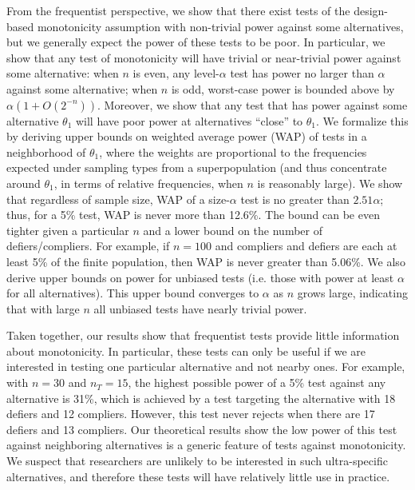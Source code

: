 \documentclass[12pt,reqno]{amsart}
\begin{document}
From the frequentist perspective, we show that there exist tests of the design-based
monotonicity assumption with non-trivial power against some alternatives, but we
generally expect the power of these tests to be poor. In particular, we show that any test of monotonicity will have trivial or near-trivial power against some alternative: when $n$ is even, any level-$\alpha$ test has power no larger than $\alpha$ against some alternative; when $n$ is odd, worst-case power is bounded above by $\alpha (1 + O(2^{-n}))$. Moreover, we show
that any test that has power against some alternative $\theta_1$ will have poor power at
alternatives ``close'' to $\theta_1$. We formalize this by deriving upper bounds on weighted average power (WAP) of tests in a neighborhood of $\theta_1$, where the weights
are proportional to the frequencies expected under sampling types from a superpopulation (and
thus concentrate around $\theta_1$, in terms of relative frequencies, when $n$ is
reasonably large). We show that regardless of sample size, WAP of a size-$\alpha$
test
is no greater than $2.51 \alpha$; thus, for a 5\% test, WAP is never more than
12.6\%. The
bound can be even tighter given a particular $n$ and a lower bound on the number of
defiers/compliers. For example, if $n=100$ and compliers and defiers are each at least
5\% of the finite population, then WAP is never greater than 5.06\%. We also derive upper bounds on power for unbiased tests (i.e. those with power at least $\alpha$ for all alternatives). This upper bound converges to $\alpha$ as $n$ grows large, indicating that with large $n$ all unbiased tests have nearly trivial power. 

Taken together, our results show that frequentist tests provide little information about monotonicity.
In particular, these tests can only be useful if we are interested in testing one particular alternative and not
nearby ones. For example, with $n=30$ and $n_T=15$, the highest possible power of a 5\% test against any alternative is 31\%, which is achieved by a test targeting the alternative with 18 defiers and 12 compliers. However, this test never rejects when there are 17 defiers and 13 compliers. Our theoretical results show the low power of this test against neighboring alternatives is a generic feature of tests against monotonicity. We suspect that researchers are unlikely to be interested in such ultra-specific alternatives, and therefore these tests will
have relatively little use in practice. 
\end{document}
